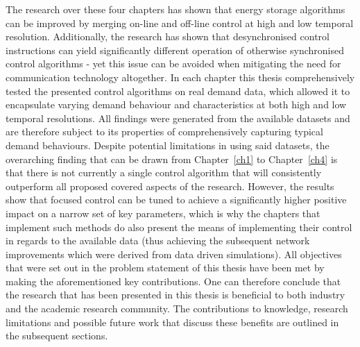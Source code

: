 The research over these four chapters has shown that energy storage algorithms can be improved by merging on-line and off-line control at high and low temporal resolution.
Additionally, the research has shown that desynchronised control instructions can yield significantly different operation of otherwise synchronised control algorithms - yet this issue can be avoided when mitigating the need for communication technology altogether.
In each chapter this thesis comprehensively tested the presented control algorithms on real demand data, which allowed it to encapsulate varying demand behaviour and characteristics at both high and low temporal resolutions.
All findings were generated from the available datasets and are therefore subject to its properties of comprehensively capturing typical demand behaviours.
Despite potential limitations in using said datasets, the overarching finding that can be drawn from Chapter~\ref{ch1} to Chapter~\ref{ch4} is that there is not currently a single control algorithm that will consistently outperform all proposed covered aspects of the research.
However, the results show that focused control can be tuned to achieve a significantly higher positive impact on a narrow set of key parameters, which is why the chapters that implement such methods do also present the means of implementing their control in regards to the available data (thus achieving the subsequent network improvements which were derived from data driven simulations).
All objectives that were set out in the problem statement of this thesis have been met by making the aforementioned key contributions.
One can therefore conclude that the research that has been presented in this thesis is beneficial to both industry and the academic research community.
The contributions to knowledge, research limitations and possible future work that discuss these benefits are outlined in the subsequent sections.
